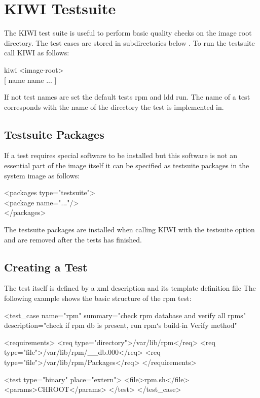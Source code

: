 \chapter{KIWI Testsuite}
\label{chapter:testing}
\minitoc

The KIWI test suite is useful to perform basic quality checks on
the image root directory. The test cases are stored in subdirectories
below . To run the testsuite call KIWI as
follows:

\begin{Command}{12cm}
 kiwi  <image-root> \bs \\
\hspace*{1cm}[  name  name ... ]
\end{Command}

If not test names are set the default tests rpm and ldd run.
The name of a test corresponds with the name of the directory
the test is implemented in.

\section{Testsuite Packages}
If a test requires special software to be installed but this
software is not an essential part of the image itself it can be
specified as testsuite packages in the system image 
as follows:

\begin{Command}{12cm}
<packages type="testsuite">\\
\hspace*{1cm}<package name="..."/>\\
</packages>
\end{Command}

The testsuite packages are installed when calling KIWI with
the testsuite option and are removed after the tests has
finished.

\section{Creating a Test}
The test itself is defined by a xml description 
and its template definition file 
The following example shows the basic structure of the rpm test:

\begin{xml}
<test_case
  name="rpm"
  summary="check rpm database and verify all rpms"
  description="check if rpm db is present, run rpm`s build-in Verify method"

  <requirements>
     <req type="directory">/var/lib/rpm</req>
     <req type="file">/var/lib/rpm/__db.000</req>
     <req type="file">/var/lib/rpm/Packages</req>
  </requirements>

  <test type="binary"  place="extern">
     <file>rpm.sh</file>
     <params>CHROOT</params>
  </test>
</test_case>
\end{xml}

